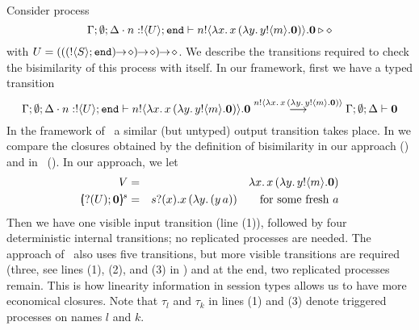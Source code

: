 
\begin{example}\label{exam:jr}
	Consider process
	$$\Gamma; \emptyset; \Delta \cdot n: ! \langle U \rangle ; \mathtt{end} \vdash n ! \langle \lambda x.\,x\, {(}\lambda y.\,y ! \langle m \rangle . \mathbf{0}) \rangle . \mathbf{0} \triangleright \diamond$$
	with $U = \shot{(\shot{(\shot{(\btout{S} \tinact)})})}$. 
	We describe the transitions required to check the bisimilarity
	of this process with itself. 
	In our framework, first we have a typed transition
	$$
	\Gamma; \emptyset; \Delta \cdot n: ! \langle U \rangle ; \mathtt{end} \vdash n ! \langle \lambda x.\,x\, {(}\lambda y.\,y ! \langle m \rangle . \mathbf{0}) \rangle . \mathbf{0} \stackrel{n ! \langle \lambda x.\,x\, {(}\lambda y.\,y ! \langle m \rangle . \mathbf{0}) \rangle}{\longrightarrow}\Gamma; \emptyset; \Delta \vdash \mathbf{0}
	$$
	In the framework of~\cite{JeffreyR05} a similar (but untyped) output transition takes place.
    In  we compare the closures obtained by the definition of bisimilarity in our approach () and in~\cite{JeffreyR05} ().
    In our approach, we let 
    \begin{eqnarray*}
    V & = & \abs{x}{\appl{x}(\abs{y}{\bout{y}{m}} \inact)} \\
	\mapchar{\btinp{U} \inact}{s} & = & \binp{s}{x} \appl{x}{(\abs{y}{(\appl{y}{a}))}}\qquad \textrm{for some fresh $a$}
	\end{eqnarray*}
	Then we have one visible input transition (line (1)), followed by four deterministic internal transitions; no replicated processes are needed.
	The approach of~\cite{JeffreyR05} also uses five 
	 transitions, but more visible transitions are required
	(three, see lines (1), (2), and (3) in ) and at the end, two replicated processes remain.
	This is how linearity information in session types allows us to have more economical closures.
	Note that $\tau_l$ and $\tau_k$ in lines (1) and (3) denote triggered processes on names $l$ and $k$.
	
	
	

\end{example}
